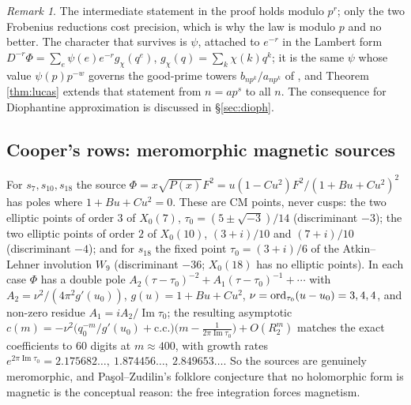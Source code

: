 \documentclass[11pt]{amsart}
\theoremstyle{definition}
\theoremstyle{remark}
\newtheorem{remark}[theorem]{Remark}
\begin{document}
\begin{remark}
The intermediate statement in the proof holds modulo $p^r$; only the two Frobenius reductions cost precision, which is why the law is modulo $p$ and no better. The character that survives is $\psi$, attached to $e^{-r}$ in the Lambert form $D^{-r}\Phi=\sum_e\psi(e)e^{-r}g_\chi(q^e)$, $g_\chi(q)=\sum_k\chi(k)q^k$; it is the same $\psi$ whose value $\psi(p)p^{-w}$ governs the good-prime towers $b_{np^k}/a_{np^k}$ of \cite{ProjSources}, and Theorem \ref{thm:lucas} extends that statement from $n=ap^s$ to all $n$. The consequence for Diophantine approximation is discussed in \S\ref{sec:dioph}.
\end{remark}

\subsection{Cooper's rows: meromorphic magnetic sources}\label{sec:cooper}
For $s_7,s_{10},s_{18}$ the source $\Phi=x\sqrt{P(x)}F^2=u(1-Cu^2)F^2/(1+Bu+Cu^2)^2$ has poles where $1+Bu+Cu^2=0$. These are CM points, never cusps: the two elliptic points of order $3$ of $X_0(7)$, $\tau_0=(5\pm\sqrt{-3})/14$ (discriminant $-3$); the two elliptic points of order $2$ of $X_0(10)$, $(3+i)/10$ and $(7+i)/10$ (discriminant $-4$); and for $s_{18}$ the fixed point $\tau_0=(3+i)/6$ of the Atkin--Lehner involution $W_9$ (discriminant $-36$; $X_0(18)$ has no elliptic points). In each case $\Phi$ has a double pole $A_2(\tau-\tau_0)^{-2}+A_1(\tau-\tau_0)^{-1}+\cdots$ with $A_2=\nu^2/(4\pi^2g'(u_0))$, $g(u)=1+Bu+Cu^2$, $\nu=\operatorname{ord}_{\tau_0}(u-u_0)=3,4,4$, and non-zero residue $A_1=iA_2/\operatorname{Im}\tau_0$; the resulting asymptotic $c(m)=-\nu^2\bigl(q_0^{-m}/g'(u_0)+\text{c.c.}\bigr)\bigl(m-\frac1{2\pi\operatorname{Im}\tau_0}\bigr)+O(R_2^m)$ matches the exact coefficients to $60$ digits at $m\approx400$, with growth rates $e^{2\pi\operatorname{Im}\tau_0}=2.175682\ldots,\ 1.874456\ldots,\ 2.849653\ldots$. So the sources are genuinely meromorphic, and Pa\c sol--Zudilin's folklore conjecture that no holomorphic form is magnetic \cite{PasolZudilin} is the conceptual reason: the free integration forces magnetism.
\end{document}
